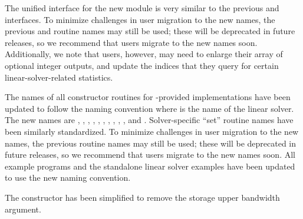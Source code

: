 The unified interface for the new {\kinls} module is very similar to the
previous {\kindls} and {\kinspils} interfaces. To minimize challenges in user
migration to the new names, the previous {\CC} and {\F} routine names may still
be used; these will be deprecated in future releases, so we recommend that users
migrate to the new names soon. Additionally, we note that {\F} users, however,
may need to enlarge their  array of optional integer outputs, and
update the indices that they query for certain linear-solver-related
statistics.

The names of all constructor routines for {\sundials}-provided
{\sunlinsol} implementations have been updated to follow the naming convention
 where \id{*} is the name of the linear solver. The new names
are
,
,
,
,\newline
{},
,
,
,
,
, and
.  Solver-specific ``set'' routine names have
been similarly standardized.  To minimize challenges in user migration
to the new names, the previous routine names may still be used; these
will be deprecated in future releases, so we recommend that users
migrate to the new names soon. All {\kinsol} example programs and the standalone
linear solver examples have been updated to use the new naming convention.

The  constructor has been simplified to remove the
storage upper bandwidth argument.

